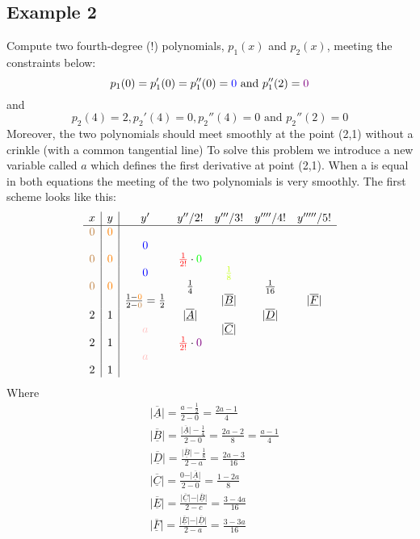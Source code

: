 \subsection{Example 2}
Compute two fourth-degree (!) polynomials, $p_1(x)$ and $p_2(x)$, meeting the constraints below:
$$
p_1(0)=p_1'(0)=p_1''(0)=\textcolor{blue}{0} \text{ and }p_1''(2)=\textcolor{violet}{0}
$$
and
$$
p_2(4)=2, p_2'(4)=0, p_2''(4)=0 \text{ and } p_2''(2)=0
$$
Moreover, the two polynomials should meet smoothly at the point (2,1) without a crinkle (with a common tangential line)
To solve this problem we introduce a new variable called $a$ which defines the first derivative at point (2,1). When a is equal in both equations the meeting of the two polynomials is very smoothly.
The first scheme looks like this:
\[
	\begin{array}{c|c|ccccc}
 x & y & y' & y''/2! &y'''/3! &y''''/4! &y'''''/5!\\
\hline
	\textcolor{brown}{0} & \textcolor{orange}{0}\\
	    &     & \textcolor{blue}{0} \\
	\textcolor{brown}{0} & \textcolor{orange}{0}&             & \textcolor{red}{\frac{1}{2!}}\cdot \textcolor{green}{0}\\
	    &     &  \textcolor{blue}{0}  &              & \textcolor{lime}{\frac{1}{8}}\\
	\textcolor{brown}{0} & \textcolor{orange}{0} &             & \frac{1}{4} & & \frac{1}{16}\\           
	    &     & \frac{1-\textcolor{orange}{0}}{2-\textcolor{brown}{0}}=\frac{1}{2} & & \vert\underline{\overline{B}}\vert   &    & \vert\underline{\overline{F}}\vert\\         
	2 & 1    & &\vert\underline{\overline{A}}\vert & &\vert\underline{\overline{D}}\vert\\
	    &     & \textcolor{pink}{a} & &\vert\underline{\overline{C}}\vert\\ 
        2 & 1    &&  \textcolor{red}{\frac{1}{2!}}\cdot\textcolor{violet}{0}\\
	    &     & \textcolor{pink}{a}\\ 
        2 & 1        

	\end{array}
\]
Where
$$
\begin{aligned}
&\vert\underline{\overline{A}}\vert=\frac{a-\frac{1}{2}}{2-0}=\frac{2 a-1}{4} \\
&\vert\underline{\overline{B}}\vert=\frac{\vert\underline{\overline{A}}\vert-\frac{1}{4}}{2-0}=\frac{2 a-2}{8}=\frac{a-1}{4} \\
&\vert\underline{\overline{D}}\vert=\frac{\vert\underline{\overline{B}}\vert-\frac{1}{8}}{2-a}=\frac{2 a-3}{16} \\
&\vert\underline{\overline{C}}\vert=\frac{0-\vert\underline{\overline{A}}\vert}{2-0}=\frac{1-2 a}{8} \\
&\vert\underline{\overline{E}}\vert=\frac{\vert\underline{\overline{C}}\vert-\vert\underline{\overline{B}}\vert}{2-c}=\frac{3-4 a}{16} \\
&\vert\underline{\overline{F}}\vert=\frac{\vert\underline{\overline{E}}\vert-\vert\underline{\overline{D}}\vert}{2-a}=\frac{3-3 a}{16}
\end{aligned}
$$
